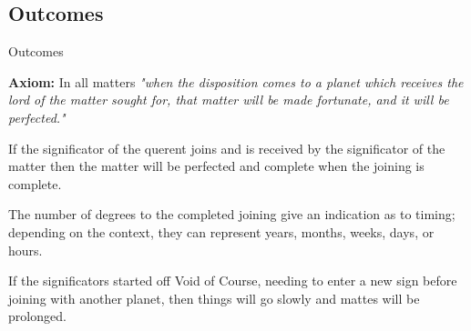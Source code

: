 \subsection{Outcomes}
\begin{frame}[t]{Outcomes}
\begin{block}{}
\textbf{Axiom:} In all matters \textsl{"when the disposition comes to a planet which receives the lord of the matter sought for, that matter will be made fortunate, and it will be perfected."}
\end{block}

If the significator of the querent joins and is received by the significator of the matter then the matter will be perfected and complete when the joining is complete.

The number of degrees to the completed joining give an indication as to timing; depending on the context, they can represent years, months, weeks, days, or hours.

If the significators started off Void of Course, needing to enter a new sign before joining with  another planet, then things will go slowly and mattes will be prolonged.

\end{frame}